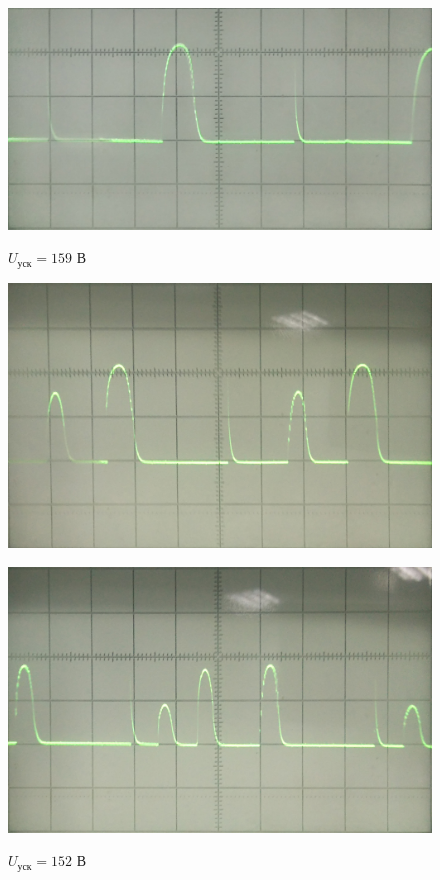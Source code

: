 \begin{figure}[h]
	\begin{minipage}[h]{0.45\linewidth}
		\centering
		\includegraphics[width=\textwidth]{img/img2}
		\caption{$U_{\text{уск}}=159$ В}
		\label{fig:img2}
	\end{minipage}
	\hfill
	\begin{minipage}[h]{0.45\linewidth}
		\centering
		{\includegraphics[width=\textwidth]{img/img3}}
		\caption{$U_{\text{уск}}=152$ В}
		\label{fig:img3}
	\end{minipage}
	\vfill
	\vspace{1em}
	\begin{minipage}[h]{0.45\linewidth}
		\centering
		{\includegraphics[width=\textwidth]{img/img4}}

\end{minipage}
\end{figure}
